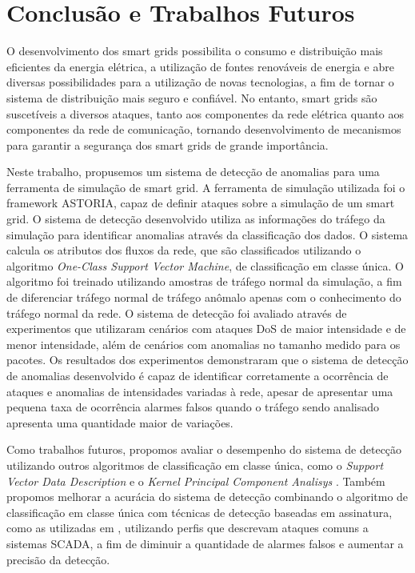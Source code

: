 \documentclass[12pt]{article}
\begin{document}
\section{Conclusão e Trabalhos Futuros}
\label{capconcl}
O desenvolvimento dos smart grids possibilita o consumo e distribuição mais eficientes da energia elétrica, a utilização de fontes renováveis de energia e abre diversas possibilidades para a utilização de novas tecnologias, a fim de tornar o sistema de distribuição mais seguro e confiável. No entanto, smart grids são suscetíveis a diversos ataques, tanto aos componentes da rede elétrica quanto aos componentes da rede de comunicação, tornando desenvolvimento de mecanismos para garantir a segurança dos smart grids de grande importância.

Neste trabalho, propusemos um sistema de detecção de anomalias para uma ferramenta de simulação de smart grid. A ferramenta de simulação utilizada foi o framework ASTORIA, capaz de definir ataques sobre a simulação de um smart grid. O sistema de detecção desenvolvido utiliza as informações do tráfego da simulação para identificar anomalias através da classificação dos dados. O sistema calcula os atributos dos fluxos da rede, que são classificados utilizando o algoritmo \emph{One-Class Support Vector Machine}, de classificação em classe única. O algoritmo foi treinado utilizando amostras de tráfego normal da simulação, a fim de diferenciar tráfego normal de tráfego anômalo apenas com o conhecimento do tráfego normal da rede. O sistema de detecção foi avaliado através de experimentos que utilizaram cenários com ataques DoS de maior intensidade e de menor intensidade, além de cenários com anomalias no tamanho medido para os pacotes. Os resultados dos experimentos demonstraram que o sistema de detecção de anomalias desenvolvido é capaz de identificar corretamente a ocorrência de ataques e anomalias de intensidades variadas à rede, apesar de apresentar uma pequena taxa de ocorrência alarmes falsos quando o tráfego sendo analisado apresenta uma quantidade maior de variações.

Como trabalhos futuros, propomos avaliar o desempenho do sistema de detecção utilizando outros algoritmos de classificação em classe única, como o \emph{Support Vector Data Description} \cite{tax2004support} e o \emph{Kernel Principal Component Analisys} \cite{hoffmann2007kernel}. Também propomos melhorar a acurácia do sistema de detecção combinando o algoritmo de classificação em classe única com técnicas de detecção baseadas em assinatura, como as utilizadas em \cite{yang2013iecdetection}, utilizando perfis que descrevam ataques comuns a sistemas SCADA, a fim de diminuir a quantidade de alarmes falsos e aumentar a precisão da detecção.




\end{document}
